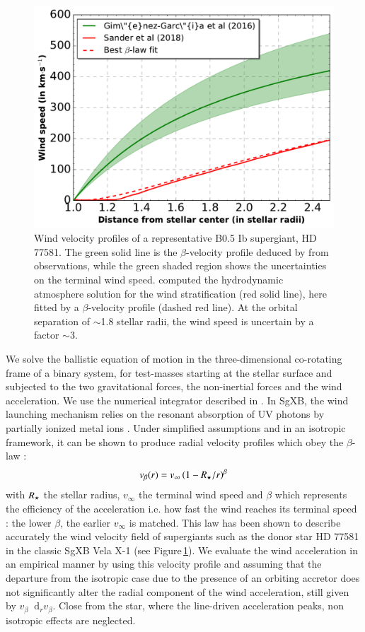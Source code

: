\documentclass[letter]{aa}
\makeatletter
\newcommand{\sgx}{SgXB\xspace}
\newcommand*{\ie}{i.e.\@\xspace}
\newcommand*\diff{\mathop{}\!\mathrm{d}}
\newcommand{\mystar}{{\fontfamily{lmr}\selectfont$\star$}}
\makeatother
\begin{document}
\begin{figure}
\centering
\includegraphics[width=1\columnwidth]{Pictures/vel_prof.pdf}
\caption{Wind velocity profiles of a representative B0.5 Ib supergiant, HD 77581. The green solid line is the $\beta$-velocity profile deduced by \cite{Gimenez-Garcia2016} from observations, while the green shaded region shows the uncertainties on the terminal wind speed. \cite{Sander2017} computed the hydrodynamic atmosphere solution for the wind stratification (red solid line), here fitted by a $\beta$-velocity profile (dashed red line). At the orbital separation of $\sim$1.8 stellar radii, the wind speed is uncertain by a factor $\sim$3.}
\label{fig:vel_prof}
\end{figure} 

We solve the ballistic equation of motion in the three-dimensional co-rotating frame of a binary system, for test-masses starting at the stellar surface and subjected to the two gravitational forces, the non-inertial forces and the wind acceleration. We use the numerical integrator described in \cite{ElMellah2016a}. In \sgx, the wind launching mechanism relies on the resonant absorption of UV photons by partially ionized metal ions \citep{Lucy1970,Castor1975}. Under simplified assumptions and in an isotropic framework, it can be shown to produce radial velocity profiles which obey the $\beta$-law :
\begin{equation}
v_{\beta}(r)=v_{\infty}\left(1-R_{\text{\mystar}}/r\right)^{\beta}
\end{equation}
with $R_{\text{\mystar}}$ the stellar radius, $v_{\infty}$ the terminal wind speed and $\beta$ which represents the efficiency of the acceleration \ie how fast the wind reaches its terminal speed : the lower $\beta$, the earlier $v_{\infty}$ is matched. This law has been shown to describe accurately the wind velocity field of supergiants such as the donor star HD 77581 in the classic \sgx Vela X-1 (see Figure\,\ref{fig:vel_prof}). We evaluate the wind acceleration in an empirical manner by using this velocity profile and assuming that the departure from the isotropic case due to the presence of an orbiting accretor does not significantly alter the radial component of the wind acceleration, still given by $v_{\beta}\diff_rv_{\beta}$. Close from the star, where the line-driven acceleration peaks, non isotropic effects are neglected.
\end{document}
